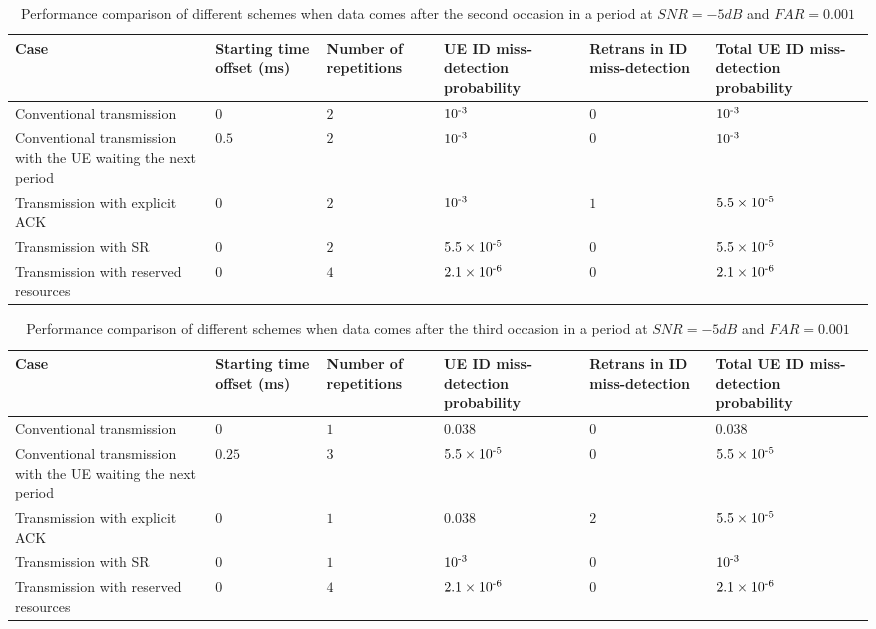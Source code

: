 \documentclass{ieeeaccess}
\begin{document}
\begin{table}[htbp]
\caption{Performance comparison of different schemes when data comes after the second occasion in a period at $SNR = -5dB$ and $FAR = 0.001$}
\begin{center}
\begin{tabular}{|p{6em}|p{3em}|p{3em}|p{3.2em}|p{3.2em}|p{3.2em}|}
 \hline
 \textbf{Case} & \textbf{Starting time offset (ms)}&\textbf{Number of repetitions}&\textbf{UE ID miss-detection probability}&\textbf{Retrans in ID miss-detection}&\textbf{Total UE ID miss-detection probability}\\
 \hline
 Conventional transmission&$0$&$2$&$10\textsuperscript{-3}$&$0$&$10\textsuperscript{-3}$\\
 \hline
 Conventional transmission with the UE waiting the next period&$0.5$&$2$&$10\textsuperscript{-3}$&$0$&$10\textsuperscript{-3}$\\
 \hline
Transmission with explicit ACK&$0$&$2$&$10\textsuperscript{-3}$&$1$&$5.5\times10\textsuperscript{-5}$\\
\hline
Transmission with SR&$0$&$2$&$5.5\times10\textsuperscript{-5}$&$0$&$5.5\times10\textsuperscript{-5}$\\
 \hline
 Transmission with reserved resources&$0$&$4$&$2.1\times10\textsuperscript{-6}$&$0$&$2.1\times10\textsuperscript{-6}$\\
 \hline
\end{tabular}
\label{tab7}
\end{center}

\end{table}

\begin{table}[htbp]
\caption{Performance comparison of different schemes when data comes after the third occasion in a period at $SNR = -5dB$ and $FAR = 0.001$}
\begin{center}
\begin{tabular}{|p{6em}|p{3em}|p{3em}|p{3.2em}|p{3.2em}|p{3.2em}|}
 \hline
 \textbf{Case} & \textbf{Starting time offset (ms)}&\textbf{Number of repetitions}&\textbf{UE ID miss-detection probability}&\textbf{Retrans in ID miss-detection}&\textbf{Total UE ID miss-detection probability}\\
 \hline
 Conventional transmission&$0$&$1$&$0.038$&$0$&$0.038$\\
 \hline
  Conventional transmission with the UE waiting the next period&$0.25$&$3$&$5.5\times10\textsuperscript{-5}$&$0$&$5.5\times10\textsuperscript{-5}$\\
 \hline
Transmission with explicit ACK&$0$&$1$&$0.038$&$2$&$5.5\times10\textsuperscript{-5}$\\
\hline
Transmission with SR&$0$&$1$&$10\textsuperscript{-3}$&$0$&$10\textsuperscript{-3}$\\
 \hline
 Transmission with reserved resources&$0$&$4$&$2.1\times10\textsuperscript{-6}$&$0$&$2.1\times10\textsuperscript{-6}$\\
 \hline
\end{tabular}
\label{tab8}
\end{center}

\end{table}
\end{document}
